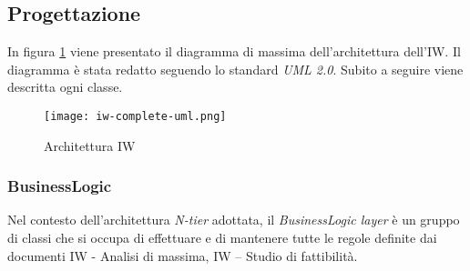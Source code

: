 \subsection{Progettazione}
\label{sec:progettazione}
In figura \ref{fig:ark-mod-iw} viene presentato il diagramma di massima dell’architettura dell’IW. Il diagramma è stata redatto seguendo lo standard \emph{UML 2.0}. Subito a seguire viene descritta ogni classe.
\begin{figure}[htbp]
    
    \centering
    \texttt{[image: iw-complete-uml.png]} 
    \caption{Architettura IW}
    \label{fig:ark-mod-iw} 
\end{figure}

\subsubsection{BusinessLogic} %
Nel contesto dell’architettura \emph{N-tier} adottata, il \emph{BusinessLogic layer} è un gruppo di classi che si occupa di effettuare e di mantenere tutte le regole definite dai documenti IW - Analisi di massima, IW – Studio di fattibilità.  

